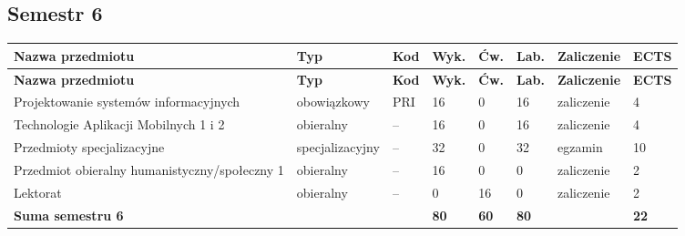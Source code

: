 \documentclass[12pt,a4paper]{article}
\newcommand{\thdrule}{\noalign{\global\setlength{\extrarowheight}{0pt}}}
\newcommand{\thdend}{\noalign{\global\setlength{\extrarowheight}{4pt}}}
\begin{document}
\subsection*{Semestr 6}

{\scriptsize
\begin{longtable}{m{5.0cm}m{1.9cm}m{0.75cm}m{0.85cm}m{0.85cm}m{0.85cm}m{1.45cm}m{0.9cm}}
\thdrule\toprule
\rowcolor{pjatkRed}
{\color{white}\footnotesize\textbf{\vphantom{Ag}Nazwa przedmiotu}} & {\color{white}\footnotesize\textbf{\vphantom{Ag}Typ}} & {\color{white}\footnotesize\textbf{\vphantom{Ag}Kod}} & {\color{white}\footnotesize\textbf{\vphantom{Ag}Wyk.}} & {\color{white}\footnotesize\textbf{\vphantom{Ag}Ćw.}} & {\color{white}\footnotesize\textbf{\vphantom{Ag}Lab.}} & {\color{white}\footnotesize\textbf{\vphantom{Ag}Zaliczenie}} & {\color{white}\footnotesize\textbf{\vphantom{Ag}ECTS}} \\
\midrule\thdend
\endfirsthead
\thdrule\toprule
\rowcolor{pjatkRed}
{\color{white}\footnotesize\textbf{\vphantom{Ag}Nazwa przedmiotu}} & {\color{white}\footnotesize\textbf{\vphantom{Ag}Typ}} & {\color{white}\footnotesize\textbf{\vphantom{Ag}Kod}} & {\color{white}\footnotesize\textbf{\vphantom{Ag}Wyk.}} & {\color{white}\footnotesize\textbf{\vphantom{Ag}Ćw.}} & {\color{white}\footnotesize\textbf{\vphantom{Ag}Lab.}} & {\color{white}\footnotesize\textbf{\vphantom{Ag}Zaliczenie}} & {\color{white}\footnotesize\textbf{\vphantom{Ag}ECTS}} \\
\midrule\thdend
\endhead
\rowcolor{tableRowLight} Projektowanie systemów informacyjnych & {\scriptsize obowiązkowy} & PRI & 16 & 0 & 16 & {\scriptsize zaliczenie} & 4 \\
\rowcolor{tableElective} Technologie Aplikacji Mobilnych 1 i 2 & {\scriptsize obieralny} & -- & 16 & 0 & 16 & {\scriptsize zaliczenie} & 4 \\
\rowcolor{tableElective} Przedmioty specjalizacyjne & {\scriptsize specjalizacyjny} & -- & 32 & 0 & 32 & {\scriptsize egzamin} & 10 \\
\rowcolor{tableElective} Przedmiot obieralny humanistyczny/społeczny 1 & {\scriptsize obieralny} & -- & 16 & 0 & 0 & {\scriptsize zaliczenie} & 2 \\
\rowcolor{tableElective} Lektorat & {\scriptsize obieralny} & -- & 0 & 16 & 0 & {\scriptsize zaliczenie} & 2 \\
\midrule[\heavyrulewidth]
\rowcolor{tableSummary} \textbf{Suma semestru 6} & & & \textbf{80} & \textbf{60} & \textbf{80} & & \textbf{22} \\
\bottomrule
\end{longtable}}
\end{document}
